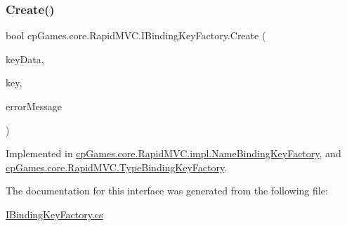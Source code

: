 \subsubsection{\texorpdfstring{Create()}{Create()}}
{\footnotesize\ttfamily bool cp\+Games.\+core.\+Rapid\+M\+V\+C.\+I\+Binding\+Key\+Factory.\+Create (\begin{DoxyParamCaption}\item[{object}]{key\+Data,  }\item[{out \mbox{\hyperlink{interfacecp_games_1_1core_1_1_rapid_m_v_c_1_1_i_binding_key}{I\+Binding\+Key}}}]{key,  }\item[{out string}]{error\+Message }\end{DoxyParamCaption})}



Implemented in \mbox{\hyperlink{classcp_games_1_1core_1_1_rapid_m_v_c_1_1impl_1_1_name_binding_key_factory_a945458041047fa0ca19f6e25a5e6da11}{cp\+Games.\+core.\+Rapid\+M\+V\+C.\+impl.\+Name\+Binding\+Key\+Factory}}, and \mbox{\hyperlink{classcp_games_1_1core_1_1_rapid_m_v_c_1_1_type_binding_key_factory_ab895639911e562ea6bbb1141911496af}{cp\+Games.\+core.\+Rapid\+M\+V\+C.\+Type\+Binding\+Key\+Factory}}.



The documentation for this interface was generated from the following file\+:\begin{DoxyCompactItemize}
\item 
\mbox{\hyperlink{_i_binding_key_factory_8cs}{I\+Binding\+Key\+Factory.\+cs}}\end{DoxyCompactItemize}
